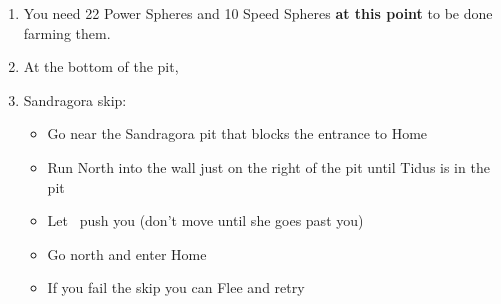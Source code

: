 \begin{enumerate}[resume]
    \blitzballdetermination[true]{%
        \item \formation{\tidus}{\lulu}{\auron}
    }{%
        \item \formation{\tidus}{\rikku}{\kimahri}
    }
    \item You need 22 Power Spheres and 10 Speed Spheres \textbf{at this point} to be done farming them.
    \item At the bottom of the pit, 
    \item Sandragora skip:
    \begin{itemize}
        \item Go near the Sandragora pit that blocks the entrance to Home
        \item Run North into the wall just on the right of the pit until Tidus is in the pit
        \item Let \rikku\ push you (don't move until she goes past you)
        \item Go north and enter Home
        \item If you fail the skip you can Flee and retry
    \end{itemize}
\end{enumerate}
\ \lossvfill \ \lossnewline \losscb \ 
